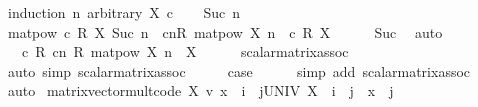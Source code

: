 \begin{isabellebody}
%
\isadelimproof
%
\endisadelimproof
%
\isatagproof
{}\isamarkupfalse%
\ {\isacharparenleft}{\kern0pt}induction\ n\ arbitrary{\isacharcolon}{\kern0pt}\ X\ c{\isacharparenright}{\kern0pt}\isanewline
\ \ \isamarkupfalse%
\ {\isacharparenleft}{\kern0pt}Suc\ n{\isacharparenright}{\kern0pt}\isanewline
\ \ \isamarkupfalse%
\ {\isachardoublequoteopen}matpow\ {\isacharparenleft}{\kern0pt}c\ {\isacharasterisk}{\kern0pt}\isactrlsub R\ X{\isacharparenright}{\kern0pt}\ {\isacharparenleft}{\kern0pt}Suc\ n{\isacharparenright}{\kern0pt}\ {\isacharequal}{\kern0pt}\ {\isacharparenleft}{\kern0pt}c{\isacharcircum}{\kern0pt}n{\isacharparenright}{\kern0pt}{\isacharasterisk}{\kern0pt}\isactrlsub R\ {\isacharparenleft}{\kern0pt}matpow\ X{\isacharparenright}{\kern0pt}\ n\ {\isacharasterisk}{\kern0pt}{\isacharasterisk}{\kern0pt}\ c\ {\isacharasterisk}{\kern0pt}\isactrlsub R\ X{\isachardoublequoteclose}\isanewline
\ \ \ \ \isamarkupfalse%
\ Suc\ \isamarkupfalse%
\ auto\isanewline
\ \ \isamarkupfalse%
\ \isamarkupfalse%
\ {\isachardoublequoteopen}{\isasymdots}\ {\isacharequal}{\kern0pt}\ c\ {\isacharasterisk}{\kern0pt}\isactrlsub R\ {\isacharparenleft}{\kern0pt}{\isacharparenleft}{\kern0pt}c{\isacharcircum}{\kern0pt}n{\isacharparenright}{\kern0pt}\ {\isacharasterisk}{\kern0pt}\isactrlsub R\ {\isacharparenleft}{\kern0pt}matpow\ X{\isacharparenright}{\kern0pt}\ n\ {\isacharasterisk}{\kern0pt}{\isacharasterisk}{\kern0pt}\ X{\isacharparenright}{\kern0pt}{\isachardoublequoteclose}\isanewline
\ \ \ \ \isamarkupfalse%
\ scalar{\isacharunderscore}{\kern0pt}matrix{\isacharunderscore}{\kern0pt}assoc{\isacharprime}{\kern0pt}\ \isanewline
\ \ \ \ \isamarkupfalse%
\ {\isacharparenleft}{\kern0pt}auto\ simp{\isacharcolon}{\kern0pt}\ scalar{\isacharunderscore}{\kern0pt}matrix{\isacharunderscore}{\kern0pt}assoc{\isacharprime}{\kern0pt}{\isacharparenright}{\kern0pt}\isanewline
\ \ \isamarkupfalse%
\ \isamarkupfalse%
\ {\isacharquery}{\kern0pt}case\isanewline
\ \ \ \ \isamarkupfalse%
\ {\isacharparenleft}{\kern0pt}simp\ add{\isacharcolon}{\kern0pt}\ scalar{\isacharunderscore}{\kern0pt}matrix{\isacharunderscore}{\kern0pt}assoc{\isacharparenright}{\kern0pt}\isanewline
{}\isamarkupfalse%
\ auto%
\endisatagproof
{\isafoldproof}%
%
\isadelimproof
\isanewline
%
\endisadelimproof
\isanewline
{}\isamarkupfalse%
\ matrix{\isacharunderscore}{\kern0pt}vector{\isacharunderscore}{\kern0pt}mult{\isacharunderscore}{\kern0pt}code{\isacharprime}{\kern0pt}{\isacharcolon}{\kern0pt}\ {\isachardoublequoteopen}{\isacharparenleft}{\kern0pt}X\ {\isacharasterisk}{\kern0pt}v\ x{\isacharparenright}{\kern0pt}\ {\isachardollar}{\kern0pt}\ i\ {\isacharequal}{\kern0pt}\ {\isacharparenleft}{\kern0pt}{\isasymSum}j{\isasymin}UNIV{\isachardot}{\kern0pt}\ X\ {\isachardollar}{\kern0pt}\ i\ {\isachardollar}{\kern0pt}\ j\ {\isacharasterisk}{\kern0pt}\ x\ {\isachardollar}{\kern0pt}\ j{\isacharparenright}{\kern0pt}{\isachardoublequoteclose}\isanewline

\end{isabellebody}
